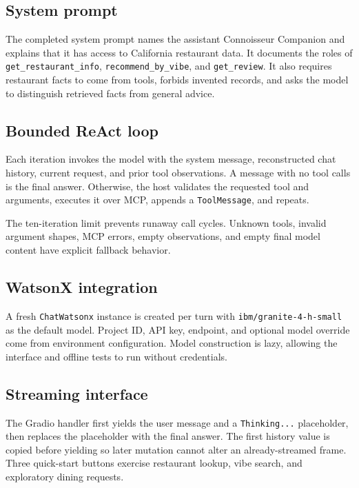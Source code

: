 \documentclass[11pt]{article}
\begin{document}
\subsection{System prompt}

The completed system prompt names the assistant Connoisseur Companion and
explains that it has access to California restaurant data. It documents the
roles of \texttt{get\_restaurant\_info}, \texttt{recommend\_by\_vibe}, and
\texttt{get\_review}. It also requires restaurant facts to come from tools,
forbids invented records, and asks the model to distinguish retrieved facts from
general advice.

\subsection{Bounded ReAct loop}

Each iteration invokes the model with the system message, reconstructed chat
history, current request, and prior tool observations. A message with no tool
calls is the final answer. Otherwise, the host validates the requested tool and
arguments, executes it over MCP, appends a \texttt{ToolMessage}, and repeats.

The ten-iteration limit prevents runaway call cycles. Unknown tools, invalid
argument shapes, MCP errors, empty observations, and empty final model content
have explicit fallback behavior.

\subsection{WatsonX integration}

A fresh \texttt{ChatWatsonx} instance is created per turn with
\texttt{ibm/granite-4-h-small} as the default model. Project ID, API key,
endpoint, and optional model override come from environment configuration.
Model construction is lazy, allowing the interface and offline tests to run
without credentials.

\subsection{Streaming interface}

The Gradio handler first yields the user message and a \texttt{Thinking...}
placeholder, then replaces the placeholder with the final answer. The first
history value is copied before yielding so later mutation cannot alter an
already-streamed frame. Three quick-start buttons exercise restaurant lookup,
vibe search, and exploratory dining requests.
\end{document}

